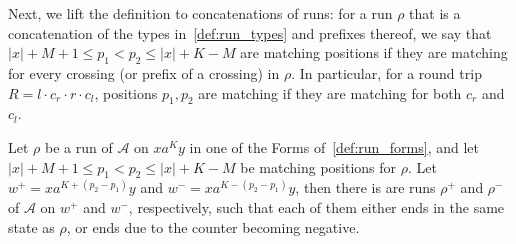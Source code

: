 \documentclass[USenglish]{lipics-v2021}
\newcommand{\cA}{\mathcal{A}}
\begin{document}
Next, we lift the definition to concatenations of runs: for a run $\rho$ that is a
concatenation of the types in~\cref{def:run_types} and prefixes thereof, we say
that $|x|+M+1 \leq p_1<p_2 \leq |x|+K-M$ are matching positions if they are matching
for every crossing (or prefix of a crossing) in $\rho$.  In particular, for a round
trip $R=l\cdot c_r\cdot r\cdot c_l$, positions $p_1,p_2$ are matching if they are matching
for both $c_r$ and $c_l$.


\begin{lemma}
\label{lem:matching_positions_are_pumpable} Let $\rho$ be a run of $\cA$ on
$xa^Ky$ in one of the Forms of~\cref{def:run_forms}, and let $|x|+M+1\le
p_1<p_2\le |x|+K-M$ be matching positions for $\rho$. Let $w^+=xa^{K+(p_2-p_1)}y$
and $w^-=xa^{K-(p_2-p_1)}y$, then there is are runs $\rho^+$ and $\rho^-$ of $\cA$
on $w^+$ and $w^-$, respectively, such that each of them either ends in the
same state as $\rho$, or ends due to the counter becoming negative.
\end{lemma}
\end{document}
